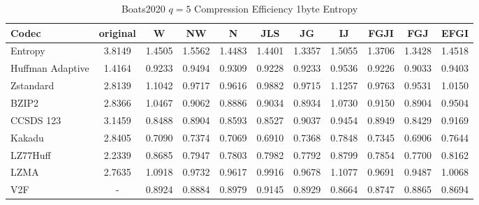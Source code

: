 \documentclass{article}
\begin{document}
\begin{table}[h!]
\centering
\caption{Boats2020 $q=5$ Compression Efficiency 1byte Entropy}
\begin{tabular}{|l|cccccccccc|}
\hline
Codec &  original &      W &     NW &      N &    JLS &     JG &     IJ &   FGJI &    FGJ &   EFGI \\
\hline
Entropy & 3.8149 & 1.4505 & 1.5562 & 1.4483 & 1.4401 & 1.3357 & 1.5055 & 1.3706 & 1.3428 & 1.4518 \\
\hline
Huffman Adaptive &    1.4164 & 0.9233 & 0.9494 & 0.9309 & 0.9228 & 0.9233 & 0.9536 & 0.9226 & 0.9033 & 0.9403 \\
Zstandard        &    2.8139 & 1.1042 & 0.9717 & 0.9616 & 0.9882 & 0.9715 & 1.1257 & 0.9763 & 0.9531 & 1.0150 \\
BZIP2            &    2.8366 & 1.0467 & 0.9062 & 0.8886 & 0.9034 & 0.8934 & 1.0730 & 0.9150 & 0.8904 & 0.9504 \\
CCSDS 123        &    3.1459 & 0.8488 & 0.8904 & 0.8593 & 0.8527 & 0.9037 & 0.9454 & 0.8949 & 0.8429 & 0.9169 \\
Kakadu           &    2.8405 & 0.7090 & 0.7374 & 0.7069 & 0.6910 & 0.7368 & 0.7848 & 0.7345 & 0.6906 & 0.7644 \\
LZ77Huff         &    2.2339 & 0.8685 & 0.7947 & 0.7803 & 0.7982 & 0.7792 & 0.8799 & 0.7854 & 0.7700 & 0.8162 \\
LZMA             &    2.7635 & 1.0918 & 0.9732 & 0.9617 & 0.9916 & 0.9678 & 1.1077 & 0.9691 & 0.9487 & 1.0068 \\
V2F              &    - & 0.8924 & 0.8884 & 0.8979 & 0.9145 & 0.8929 & 0.8664 & 0.8747 & 0.8865 & 0.8694 \\
\hline
\end{tabular}
\end{table}
\end{document}
